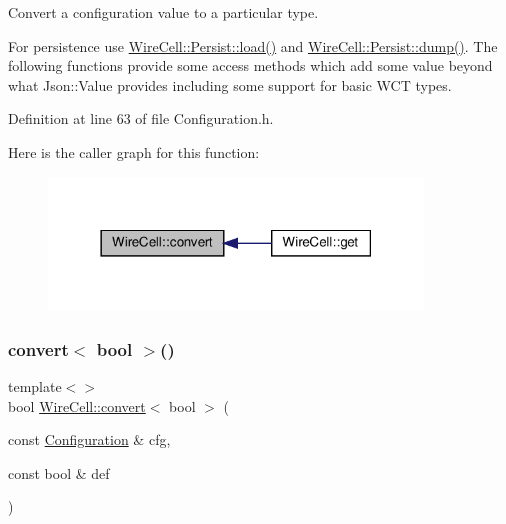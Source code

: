 Convert a configuration value to a particular type. 

For persistence use \hyperlink{namespace_wire_cell_1_1_persist_ab922ff3e9c80bcbc9d4e8342f7d3223d}{Wire\+Cell\+::\+Persist\+::load()} and \hyperlink{namespace_wire_cell_1_1_persist_a2acf48c85b54dfa84e3a42b610cdf780}{Wire\+Cell\+::\+Persist\+::dump()}. The following functions provide some access methods which add some value beyond what Json\+::\+Value provides including some support for basic W\+CT types. 

Definition at line 63 of file Configuration.\+h.

Here is the caller graph for this function\+:
\nopagebreak
\begin{figure}[H]
\begin{center}
\leavevmode
\includegraphics[width=282pt]{namespace_wire_cell_a5f6648d6ae801b20a17b8a35fd3306e5_icgraph}
\end{center}
\end{figure}
\mbox{\label{namespace_wire_cell_ac37e45ffe2bff57d04d3a4b63880f56e}} 
\subsubsection{\texorpdfstring{convert$<$ bool $>$()}{convert< bool >()}}
{\footnotesize\ttfamily template$<$$>$ \\
bool \hyperlink{namespace_wire_cell_a5f6648d6ae801b20a17b8a35fd3306e5}{Wire\+Cell\+::convert}$<$ bool $>$ (\begin{DoxyParamCaption}\item[{const \hyperlink{namespace_wire_cell_a9f705541fc1d46c608b3d32c182333ee}{Configuration} \&}]{cfg,  }\item[{const bool \&}]{def }\end{DoxyParamCaption})\hspace{0.3cm}{\ttfamily [inline]}}



